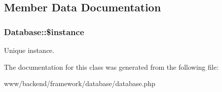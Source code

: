\subsection{Member Data Documentation}
\hypertarget{classDatabase_a313173b898c14db2a84f7fd1b14e5fb5}{
\subsubsection[{\$instance}]{\setlength{\rightskip}{0pt plus 5cm}Database::\$instance}}
\label{classDatabase_a313173b898c14db2a84f7fd1b14e5fb5}
Unique instance. 

The documentation for this class was generated from the following file:\begin{DoxyCompactItemize}
\item 
www/backend/framework/database/database.php\end{DoxyCompactItemize}
